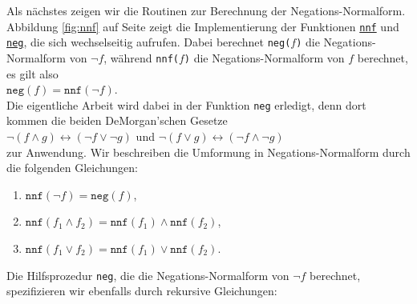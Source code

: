 Als n\"{a}chstes zeigen wir die Routinen zur Berechnung der Negations-Normalform.
Abbildung
\ref{fig:nnf} auf Seite \pageref{fig:nnf} zeigt die Implementierung der Funktionen
\href{https://github.com/karlstroetmann/Logik/blob/master/SetlX/knf.stlx}{\texttt{nnf}} und
\href{https://github.com/karlstroetmann/Logik/blob/master/SetlX/knf.stlx}{\texttt{neg}},
die sich wechselseitig aufrufen.  Dabei berechnet \texttt{neg($f$)}
die Negations-Normalform von $\neg f$, w\"{a}hrend \texttt{nnf($f$)} die
Negations-Normalform von $f$ berechnet, es gilt also
\\[0.2cm]
\hspace*{1.3cm}
$\texttt{neg}(f) = \texttt{nnf}(\neg f)$.
\\[0.2cm]
  Die eigentliche Arbeit wird dabei in der
Funktion \texttt{neg} erledigt, denn dort kommen die beiden DeMorgan'schen Gesetze \\[0.2cm]
\hspace*{1.3cm} $\neg (f \wedge g) \leftrightarrow (\neg f \vee \neg g)$ \quad und \quad $\neg (f \vee g) \leftrightarrow (\neg f \wedge \neg g)$ \\[0.2cm]
zur Anwendung.  Wir beschreiben die Umformung in Negations-Normalform durch 
die folgenden Gleichungen:
\begin{enumerate}
\item $\texttt{nnf}(\neg f) = \texttt{neg}(f)$,
\item $\texttt{nnf}(f_1 \wedge f_2) = \texttt{nnf}(f_1) \wedge \texttt{nnf}(f_2)$,
\item $\texttt{nnf}(f_1 \vee f_2) = \texttt{nnf}(f_1) \vee \texttt{nnf}(f_2)$.
\end{enumerate}
Die Hilfsprozedur \texttt{neg}, die die Negations-Normalform von $\neg f$ berechnet,
spezifizieren wir ebenfalls durch rekursive Gleichungen:
